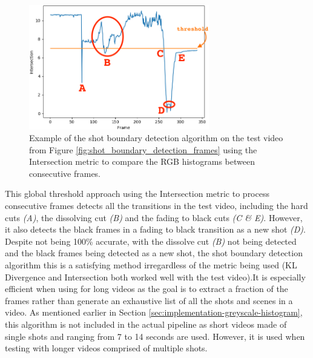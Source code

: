 \begin{figure}[h] 
\centerline{\includegraphics[width=0.70\textwidth]{figures/implementation/shot_boundary_detection_intersection.png}}
\caption{\label{fig:shot_boundary_detection_intersection}Example of the shot boundary detection algorithm on the test video from Figure \ref{fig:shot_boundary_detection_frames} using the Intersection metric to compare the RGB histograms between consecutive frames.}
\end{figure}

This global threshold approach using the Intersection metric to process consecutive frames detects all the transitions in the test video, including the hard cuts \textit{(A)}, the dissolving cut \textit{(B)} and the fading to black cuts \textit{(C \& E)}. However, it also detects the black frames in a fading to black transition as a new shot \textit{(D)}.\\

Despite not being 100\% accurate, with the dissolve cut \textit{(B)} not being detected and the black frames being detected as a new shot, the shot boundary detection algorithm this is a satisfying method irregardless of the metric being used (KL Divergence and Intersection both worked well with the test video).It is especially efficient when using for long videos as the goal is to extract a fraction of the frames rather than generate an exhaustive list of all the shots and scenes in a video. As mentioned earlier in Section \ref{sec:implementation-greyscale-histogram}, this algorithm is not included in the actual pipeline as short videos made of single shots and ranging from 7 to 14 seconds are used. However, it is used when testing with longer videos comprised of multiple shots.


